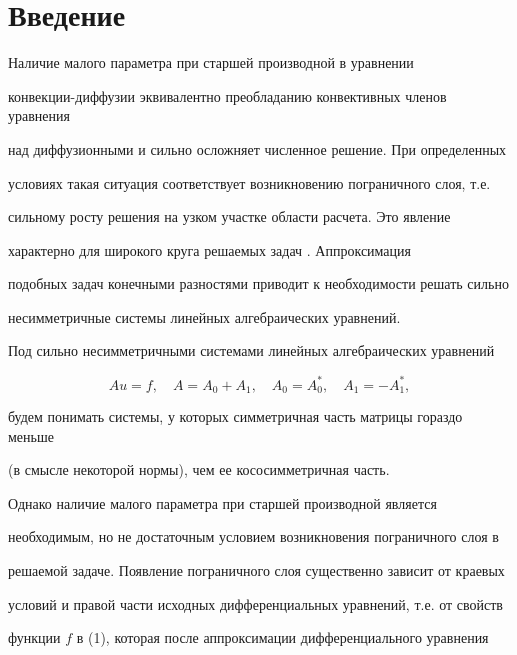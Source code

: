  


\section{Введение} 


 


Наличие малого параметра при старшей производной в уравнении 


конвекции-диффузии эквивалентно преобладанию конвективных членов уравнения 


над диффузионными и сильно осложняет численное решение. При определенных 


условиях такая ситуация соответствует возникновению пограничного слоя, т.е. 


сильному росту решения на узком участке области расчета. Это явление 


характерно для широкого круга решаемых задач \cite{Lan}. Аппроксимация 


подобных задач конечными разностями приводит к необходимости решать сильно 


несимметричные системы линейных алгебраических уравнений. 


 


Под сильно несимметричными системами линейных алгебраических уравнений 


\begin{equation} 


Au=f, \quad A=A_0+A_1,\quad A_0=A_0^*,\quad A_1=-A_1^*, 


\end{equation} 


будем понимать системы, у которых симметричная часть матрицы гораздо меньше 


(в смысле некоторой нормы), чем ее кососимметричная часть. 


 


Однако наличие малого параметра при старшей производной является 


необходимым, но не достаточным условием возникновения пограничного слоя в 


решаемой задаче. Появление пограничного слоя существенно зависит от краевых 


условий и правой части исходных дифференциальных уравнений, т.е. от свойств 


функции $f$ в (1), которая после аппроксимации дифференциального уравнения 


